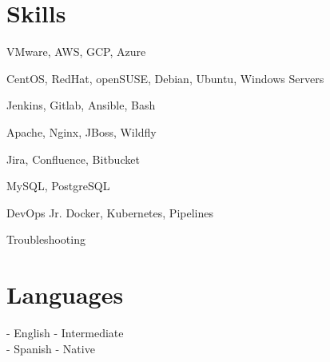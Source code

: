 \documentclass[a4paper,14pt]{article}
\begin{document}
\section{Skills}
\justify
\begin{enumerate*}
	\item VMware, AWS, GCP, Azure \hspace{0.15cm}
	\item CentOS, RedHat, openSUSE, Debian, Ubuntu, Windows Servers \hspace{0.15cm}
	\item Jenkins, Gitlab, Ansible, Bash \hspace{0.15cm}
	\item Apache, Nginx, JBoss,  Wildfly \hspace{0.15cm}
	\item Jira, Confluence, Bitbucket \hspace{0.15cm}
	\item MySQL, PostgreSQL \hspace{0.15cm}
	\item DevOps Jr. Docker, Kubernetes, Pipelines \hspace{0.15cm}
	\item Troubleshooting
\end{enumerate*}

\section{Languages}
\justify
- English - Intermediate\\
- Spanish - Native


\end{document}
